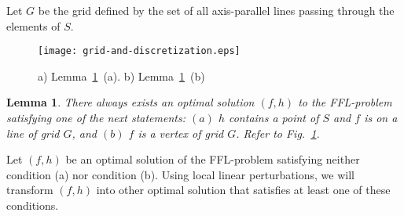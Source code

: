 \documentclass[11pt,a4paper,oneside,onecolumn]{article}
\newtheorem{lemma}[theorem]{Lemma}
\def\QED{\ensuremath{{\square}}}
\def\markatright#1{\leavevmode\unskip\nobreak\quad\hspace*{\fill}{#1}}
\newenvironment{proof}
{\begin{trivlist}\item[\hskip\labelsep{\bf Proof.}]}
{\markatright{\QED}\end{trivlist}}
\begin{document}
Let $G$ be the grid defined by the set of all axis-parallel lines
passing through the elements of $S$.
\begin{figure}[h]
  \centering
  \texttt{[image: grid-and-discretization.eps]}
  \caption{\small{a) Lemma~\ref{lemma:discretization-FFL}~(a). b)
Lemma~\ref{lemma:discretization-FFL}~(b)}}
  \label{fig:grid-and-disc}
\end{figure}
\begin{lemma}\label{lemma:discretization-FFL}
There always exists an optimal solution $(f,h)$ to the FFL-problem
satisfying one of the next statements: $(a)$ $h$ contains a point of
$S$ and $f$ is on a line of grid $G$, and $(b)$ $f$ is a vertex of
grid $G$. Refer to Fig.~\ref{fig:grid-and-disc}.
\end{lemma}
\begin{proof}
Let $(f,h)$ be an optimal solution of the FFL-problem satisfying
neither condition (a) nor condition (b). Using local linear
perturbations, we will transform $(f,h)$ into other optimal solution
that satisfies at least one of these conditions.


\end{proof}
\end{document}
